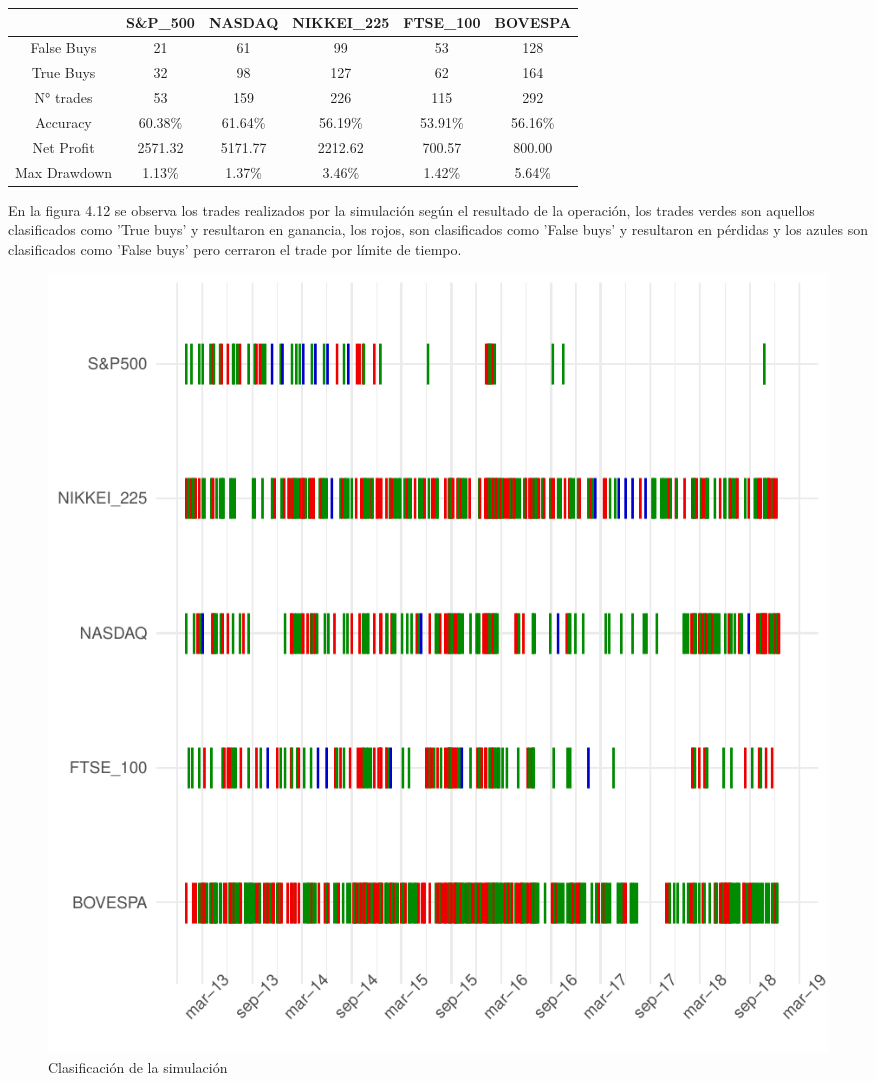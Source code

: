 \documentclass[a4paper,12pt]{Latex/Classes/PhDthesisPSnPDF}
\begin{document}
\begin{center}
\begin{table}[ht]
\centering
\begin{tabular}{cccccc}
  \hline
 & S\&P\_500 & NASDAQ & NIKKEI\_225 & FTSE\_100 & BOVESPA \\ 
  \hline
False Buys & 21 & 61 & 99 & 53 & 128 \\ 
  True Buys & 32 & 98 & 127 & 62 & 164 \\ 
  N° trades & 53 & 159 & 226 & 115 & 292 \\ 
  Accuracy & 60.38\% & 61.64\% & 56.19\% & 53.91\% & 56.16\% \\ 
  Net Profit & 2571.32 & 5171.77 & 2212.62 & 700.57 & 800.00 \\ 
  Max Drawdown & 1.13\% & 1.37\% & 3.46\% & 1.42\% & 5.64\% \\ 
   \hline
\end{tabular}
\end{table}\end{center}
 

En la figura 4.12 se observa los trades realizados por la simulación según el resultado de la operación, los trades verdes son aquellos clasificados como 'True buys' y resultaron en ganancia, los rojos, son clasificados como 'False buys' y resultaron en pérdidas y los azules son clasificados como 'False buys' pero cerraron el trade por límite de tiempo.

\begin{figure}[H]
\centering
\includegraphics{main-029}
\caption{Clasificación de la simulación}
\end{figure}
\end{document}

